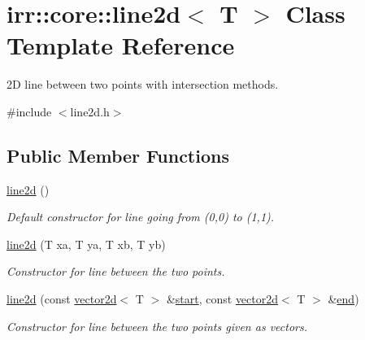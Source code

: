 \hypertarget{classirr_1_1core_1_1line2d}{}\section{irr\+:\+:core\+:\+:line2d$<$ T $>$ Class Template Reference}
\label{classirr_1_1core_1_1line2d}


2D line between two points with intersection methods.  




{\ttfamily \#include $<$line2d.\+h$>$}

\subsection*{Public Member Functions}
\begin{DoxyCompactItemize}
\item 
\mbox{\label{classirr_1_1core_1_1line2d_a7d0f25f93572eb73734da83da8490410}} 
\hyperlink{classirr_1_1core_1_1line2d_a7d0f25f93572eb73734da83da8490410}{line2d} ()
\begin{DoxyCompactList}\small\item\em Default constructor for line going from (0,0) to (1,1). \end{DoxyCompactList}\item 
\mbox{\label{classirr_1_1core_1_1line2d_af9614350cdb0527c190dcf3342ecb42e}} 
\hyperlink{classirr_1_1core_1_1line2d_af9614350cdb0527c190dcf3342ecb42e}{line2d} (T xa, T ya, T xb, T yb)
\begin{DoxyCompactList}\small\item\em Constructor for line between the two points. \end{DoxyCompactList}\item 
\mbox{\label{classirr_1_1core_1_1line2d_a447958017eba9f8667625b82c25f344c}} 
\hyperlink{classirr_1_1core_1_1line2d_a447958017eba9f8667625b82c25f344c}{line2d} (const \hyperlink{classirr_1_1core_1_1vector2d}{vector2d}$<$ T $>$ \&\hyperlink{classirr_1_1core_1_1line2d_a1d8c9b41f3c8d9c352deb5160f100c65}{start}, const \hyperlink{classirr_1_1core_1_1vector2d}{vector2d}$<$ T $>$ \&\hyperlink{classirr_1_1core_1_1line2d_ab5708ad88b14fb601450e9c8765a613d}{end})
\begin{DoxyCompactList}\small\item\em Constructor for line between the two points given as vectors. \end{DoxyCompactList}\item 

\end{DoxyCompactItemize}
